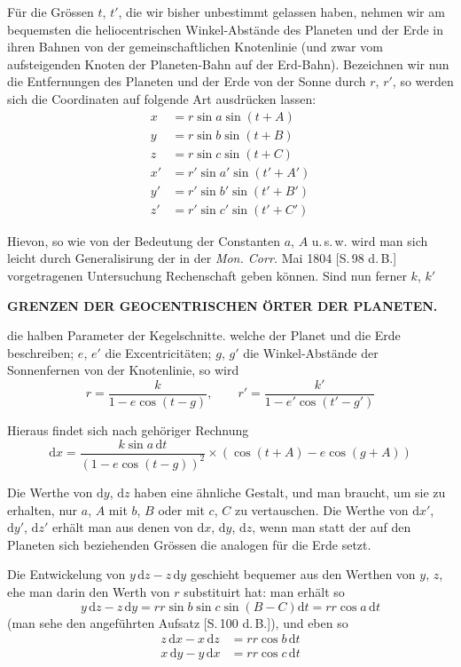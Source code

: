 Für die Grössen $t$, $t'$, die wir bisher unbestimmt gelassen haben, nehmen
wir am bequemsten die heliocentrischen Winkel-Abstände des Planeten und der
Erde in ihren Bahnen von der gemeinschaftlichen Knotenlinie (und zwar vom
aufsteigenden Knoten der Planeten-Bahn auf der Erd-Bahn). Bezeichnen wir
nun die Entfernungen des Planeten und der Erde von der Sonne durch $r$, $r'$, so
werden sich die Coordinaten auf folgende Art ausdrücken lassen:
\[
\begin{aligned}
x&=r\sin a\sin(t+A)\\
y&=r\sin b\sin(t+B)\\
z&=r\sin c\sin(t+C)\\
x'&=r'\sin a'\sin(t'+A')\\
y'&=r'\sin b'\sin(t'+B')\\
z'&=r'\sin c'\sin(t'+C')
\end{aligned}
\]

Hievon, so wie von der Bedeutung der Constanten $a$, $A$ u.\,s.\,w. wird man
sich leicht durch Generalisirung der in der \textit{Mon. Corr.} Mai 1804 [S.\,98 d.\,B.]
vorgetragenen Untersuchung Rechenschaft geben können. Sind nun ferner $k$, $k'$
\par\clearpage
\noindent{}%
%
\parbox[t]{\dimexpr\linewidth-24mm\relax}{\centering\fontsize{7.4}{9.2}\selectfont\bfseries GRENZEN DER GEOCENTRISCHEN ÖRTER DER PLANETEN.\par}%
\makebox[12mm][r]{}\par\nobreak\smallskip
\noindent die halben Parameter der Kegelschnitte. welche der Planet und die Erde beschreiben;
$e$, $e'$ die Excentricitäten; $g$, $g'$ die Winkel-Abstände der Sonnenfernen
von der Knotenlinie, so wird
\[
r=\frac{k}{1-e\cos(t-g)},\qquad r'=\frac{k'}{1-e'\cos(t'-g')}
\]

Hieraus findet sich nach gehöriger Rechnung
\[
\mathrm{d}x=\frac{k\sin a\,\mathrm{d}t}{(1-e\cos(t-g))^2}\times(\cos(t+A)-e\cos(g+A))
\]

Die Werthe von $\mathrm{d}y$, $\mathrm{d}z$ haben eine ähnliche Gestalt, und man braucht,
um sie zu erhalten, nur $a$, $A$ mit $b$, $B$ oder mit $c$, $C$ zu vertauschen. Die
Werthe von $\mathrm{d}x'$, $\mathrm{d}y'$, $\mathrm{d}z'$ erhält man aus denen von $\mathrm{d}x$, $\mathrm{d}y$, $\mathrm{d}z$, wenn man statt
der auf den Planeten sich beziehenden Grössen die analogen für die Erde setzt.

Die Entwickelung von $y\,\mathrm{d}z-z\,\mathrm{d}y$ geschieht bequemer aus den Werthen
von $y$, $z$, ehe man darin den Werth von $r$ substituirt hat: man erhält so
\[
y\,\mathrm{d}z-z\,\mathrm{d}y=rr\sin b\sin c\sin(B-C)\mathrm{d}t=rr\cos a\,\mathrm{d}t
\]
(man sehe den angeführten Aufsatz [S.\,100 d.\,B.]), und eben so
\[
\begin{aligned}
z\,\mathrm{d}x-x\,\mathrm{d}z&=rr\cos b\,\mathrm{d}t\\
x\,\mathrm{d}y-y\,\mathrm{d}x&=rr\cos c\,\mathrm{d}t
\end{aligned}
\]

